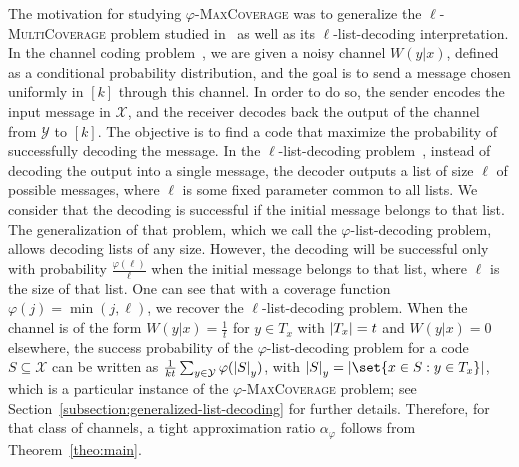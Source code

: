The motivation for studying $\varphi$-\textsc{MaxCoverage} was to generalize the $\ell$-\textsc{MultiCoverage} problem studied in~\cite{BFGG20} as well as its $\ell$-list-decoding interpretation. In the channel coding problem~\cite{BF18}, we are given a noisy channel $W(y|x)$, defined as a conditional probability distribution, and the goal is to send a message chosen uniformly in $[k]$ through this channel. In order to do so, the sender encodes the input message in $\mathcal{X}$, and the receiver decodes back the output of the channel from $\mathcal{Y}$ to $[k]$. The objective is to find a code that maximize the probability of successfully decoding the message. In the $\ell$-list-decoding problem~\cite{Elias57,Wozencraft58}, instead of decoding the output into a single message, the decoder outputs a list of size $\ell$ of possible messages, where $\ell$ is some fixed parameter common to all lists. We consider that the decoding is successful if the initial message belongs to that list. The generalization of that problem, which we call the $\varphi$-list-decoding problem, allows decoding lists of any size.  However, the decoding will be successful only with probability $\frac{\varphi(\ell)}{\ell}$ when the initial message belongs to that list, where $\ell$ is the size of that list. One can see that with a coverage function $\varphi(j) = \min(j,\ell)$, we recover the $\ell$-list-decoding problem. When the channel is of the form $W(y|x) = \frac{1}{t}$ for $y \in T_x$ with $\abs{T_x}=t$ and $W(y|x) = 0$ elsewhere, the success probability of the $\varphi$-list-decoding problem for a code $S\subseteq \mathcal{X}$ can be written as $\frac{1}{kt}\sum_{y \in \mathcal{Y}}\varphi(\abs{S}_y)$, with $\abs{S}_y = \abs{\set{x \in S : y \in T_x}}$, which is a particular instance of the $\varphi$-\textsc{MaxCoverage} problem; see Section~\ref{subsection:generalized-list-decoding} for further details. Therefore, for that class of channels, a tight approximation ratio $\alpha_{\varphi}$ follows from Theorem~\ref{theo:main}.

